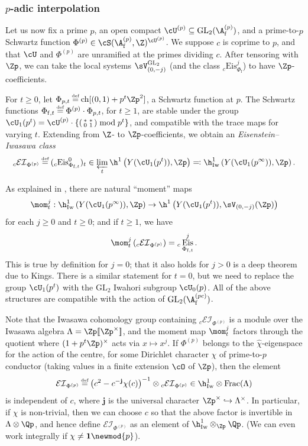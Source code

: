 \documentclass[10pt,reqno,a4paper]{amsart}
\newcommand{\stbt}[4]{\left(\begin{smallmatrix}#1 & #2\\#3&#4\end{smallmatrix}\right)}
\newcommand{\Phif}{{\Phi\subf}}
\newcommand{\subft}{_{\mathrm{f},t}}
\newcommand{\Phift}{\Phi\subft}
\newcommand{\LSkn}{\sV_{(0,-j)}}
\newcommand{\chihat}{\widehat{\chi}}
\newcommand{\subf}{_{\mathrm{f}}}
\DeclareMathOperator{\Eis}{Eis}
\newcommand{\GL}{\mathrm{GL}}
\begin{document}
\subsubsection{$p$-adic interpolation}\label{sec:Eisenstein interpolation}

Let us now fix a prime $p$, an open compact $\cU^{(p)} \subseteq \GL_2(\A\subf^{(p)})$, and a prime-to-$p$ Schwartz function $\Phi^{(p)} \in \cS(\A\subf^{(p)},\Z)^{\cU^{(p)}}$. We suppose $c$ is coprime to $p$, and that $\cU$ and $\Phi^{(p)}$ are unramified at the primes dividing $c$. After tensoring with $\Zp$, we can take the local systems $\sV_{(0,-j)}^{\GL_2}$ (and the class ${}_c \mathrm{Eis}_{\Phif}^j$) to have $\Zp$-coefficients.

For $t \geq 0$, let $\Phi_{p,t} \defeq  \operatorname{ch}[ (0, 1) + p^t\Zp^2]$, a Schwartz function at $p$. The Schwartz functions $\Phift \defeq \Phi^{(p)}\cdot \Phi_{p,t}$, for $t \ge 1$, are stable under the group $\cU_1(p^t) = \cU^{(p)} \cdot \{ \stbt{*}{*}{0}{1} \bmod p^t\}$, and compatible with the trace maps for varying $t$. Extending from $\Z$- to  $\Zp$-coefficients, we obtain an \emph{Eisenstein--Iwasawa class}
\[ {}_c \mathcal{EI}_{\Phi^{(p)}} \defeq ({}_c\mathrm{Eis}^0_{\Phi_{\mathrm{f},t}})_t \in \varprojlim_t \h^1\left(Y(\cU_1(p^t)), \Zp\right) \eqcolon \h^1_{\mathrm{Iw}}\left(Y(\cU_1(p^\infty)), \Zp\right) .\]

As explained in \cite[\S 9.1]{LSZ17}, there are natural ``moment'' maps
\[
\mom^j_t : \h^1_{\mathrm{Iw}}\left(Y(\cU_1(p^\infty)), \Zp\right) \to \h^1\left(Y(\cU_1(p^t)), \LSkn({\Zp})\right)
\]
for each $j \ge 0$ and $t \ge 0$; and if $t \ge 1$, we have
\[
\mom^j_t\left({}_c \mathcal{EI}_{\Phi^{(p)}}\right)= {}_c \Eis^j_{\Phift}.
\]
This is true by definition for $j = 0$; that it also holds for $j > 0$ is a deep theorem due to Kings. There is a similar statement for $t = 0$, but we need to replace the group $\cU_1(p^t)$ with the $\GL_2$ Iwahori subgroup $\cU_0(p)$. All of the above structures are compatible with the action of $\GL_2(\A\subf^{(pc)})$.

Note that the Iwasawa cohomology group containing ${}_c \mathcal{EI}_{\Phi^{(p)}}$ is a module over the Iwasawa algebra $\Lambda = \Zp[\![\Zp^\times]\!]$, and the moment map $\mom^j_t$ factors through the quotient where $(1 + p^t \Zp)^\times$ acts via $x \mapsto x^j$. If $\Phi^{(p)}$ belongs to the $\chihat$-eigenspace for the action of the centre, for some Dirichlet character $\chi$ of prime-to-$p$ conductor (taking values in a finite extension $\cO$ of $\Zp$), then the element
\[ \mathcal{EI}_{\Phi^{(p)}} \defeq \left(c^2 - c^{-\mathbf{j}} \chi(c) \right)^{-1} \otimes {}_c \mathcal{EI}_{\Phi^{(p)}} \in \h^1_{\mathrm{Iw}} \otimes \operatorname{Frac}(\Lambda) \]
is independent of $c$, where $\mathbf{j}$ is the universal character $\Zp^\times \hookrightarrow \Lambda^\times$. In particular, if $\chi$ is non-trivial, then we can choose $c$ so that the above factor is invertible in $\Lambda \otimes \Qp$, and hence define $\mathcal{EI}_{\Phi^{(p)}}$ as an element of $\h^1_{\mathrm{Iw}} \otimes_{\Zp} \Qp$. (We can even work integrally if $\chi \neq \mathbf{1} \newmod{p}$).
\end{document}

